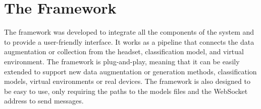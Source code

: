 \section{The Framework}
The framework was developed to integrate all the components of the system and to provide a user-friendly interface.
It works as a pipeline that connects the data augmentation or collection from the headset, classification model, and virtual environment.
The framework is plug-and-play, meaning that it can be easily extended to support new data augmentation or generation methods, classification models, virtual environments or real devices.
The framework is also designed to be easy to use, only requiring the paths to the models files and the WebSocket address to send messages.
